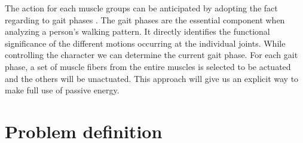 \documentclass{acm_proc_article-sp}
\begin{document}
The action for each muscle groups can be anticipated by adopting the
fact regarding to gait phases \cite{perry}. The gait phases are the essential component
when analyzing a person's walking pattern. It directly identifies the
functional significance of the different motions occurring at the
individual joints. While controlling the character we
can determine the current gait phase. For each gait phase,
a set of muscle fibers from the entire muscles is selected to be actuated
and the others will be unactuated. This approach will give us an explicit
way to make full use of passive energy.


\section{Problem definition}
\end{document}
